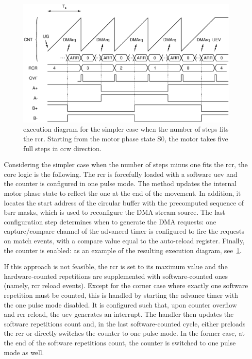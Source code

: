 \begin{figure}
    \centering
    \includegraphics[width=\linewidth]{../gfx/BStepper_run.eps}
    \caption{ execution diagram for the simpler case when the number of steps fits the \acs{rcr}. Starting from the motor phase state S0, the motor takes five full steps in \acs{ccw} direction.}
    \label{fig:bstep_run}
\end{figure}

Considering the simpler case when the number of steps minus one fits the \ac{rcr}, the core logic is the following.
The \ac{rcr} is forcefully loaded with a software \ac{uev} and the counter is configured in one pulse mode.
The  method updates the internal motor phase state to reflect the one at the end of the movement. In addition, it locates the start address of the circular buffer with the precomputed sequence of \ac{bsrr} masks, which is used to reconfigure the DMA stream source. The last configuration step determines when to generate the DMA requests: one capture/compare channel of the advanced timer is configured to fire the requests on match events, with a compare value equal to the auto-reload register. Finally, the counter is enabled: as an example of the resulting execution diagram, see~\cref{fig:bstep_run}. 

If this approach is not feasible, the \ac{rcr} is set to its maximum value and the hardware-counted repetitions are supplemented with software-counted ones (namely, \ac{rcr} reload events). Except for the corner case where exactly one software repetition must be counted, this is handled by starting the advance timer with the one pulse mode disabled. It is configured such that, upon counter overflow and \ac{rcr} reload, the \ac{uev} generates an interrupt. The handler then updates the software repetitions count and, in the last software-counted cycle, either preloads the \ac{rcr} or directly switches the counter to one pulse mode. In the former case, at the end of the software repetitions count, the counter is switched to one pulse mode as well.

